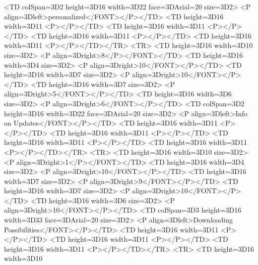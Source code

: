         <TD colSpan=3D2 height=3D16 width=3D22%
face=3DArial=20
            size=3D2>
            <P align=3Dleft>personalized</FONT></P></TD>
        <TD height=3D16 width=3D11%
            <P></P></TD>
        <TD height=3D16 width=3D11%
            <P></P></TD>
        <TD height=3D16 width=3D11%
            <P></P></TD>
        <TD height=3D16 width=3D11%
            <P></P></TD></TR>
    <TR>
        <TD height=3D16 width=3D10%
size=3D2>
            <P align=3Dright>8</P></FONT></TD>
        <TD height=3D16 width=3D4%
size=3D2>
            <P align=3Dright>10</FONT></P></TD>
        <TD height=3D16 width=3D7%
size=3D2>
            <P align=3Dright>10</FONT></P></TD>
        <TD height=3D16 width=3D7%
size=3D2>
            <P align=3Dright>5</FONT></P></TD>
        <TD height=3D16 width=3D6%
size=3D2>
            <P align=3Dright>6</FONT></P></TD>
        <TD colSpan=3D2 height=3D16 width=3D22%
face=3DArial=20
            size=3D2>
            <P align=3Dleft>Info on Updates</FONT></P></TD>
        <TD height=3D16 width=3D11%
            <P></P></TD>
        <TD height=3D16 width=3D11%
            <P></P></TD>
        <TD height=3D16 width=3D11%
            <P></P></TD>
        <TD height=3D16 width=3D11%
            <P></P></TD></TR>
    <TR>
        <TD height=3D16 width=3D10%
size=3D2>
            <P align=3Dright>1</P></FONT></TD>
        <TD height=3D16 width=3D4%
size=3D2>
            <P align=3Dright>10</FONT></P></TD>
        <TD height=3D16 width=3D7%
size=3D2>
            <P align=3Dright>9</FONT></P></TD>
        <TD height=3D16 width=3D7%
size=3D2>
            <P align=3Dright>10</FONT></P></TD>
        <TD height=3D16 width=3D6%
size=3D2>
            <P align=3Dright>10</FONT></P></TD>
        <TD colSpan=3D3 height=3D16 width=3D33%
face=3DArial=20
            size=3D2>
            <P align=3Dleft>Downloading Possibilities</FONT></P></TD>
        <TD height=3D16 width=3D11%
            <P></P></TD>
        <TD height=3D16 width=3D11%
            <P></P></TD>
        <TD height=3D16 width=3D11%
            <P></P></TD></TR>
    <TR>
        <TD height=3D16 width=3D10%
